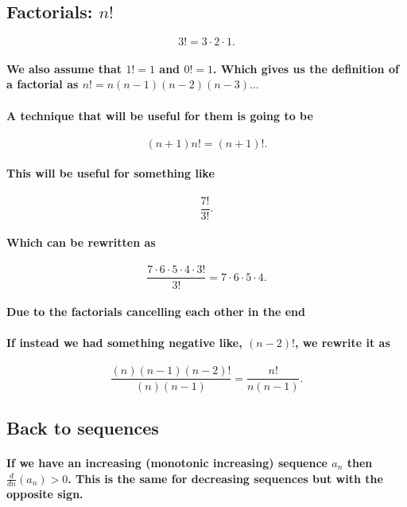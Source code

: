 \subsection{Factorials: $ n! $}%
\label{sub:Factorials: $ n! $}

\[
	3! = 3 \cdot 2\cdot 1
.\] 
\paragraph{We also assume that $ 1! = 1 $ and $ 0! = 1 $. Which gives us the definition of a factorial as $ n! = n\left( n-1 \right) \left( n-2 \right)  \left( n-3 \right) \ldots$}
\paragraph{A technique that will be useful for them is going to be }

\[
	\left( n+1 \right) n! = \left( n+1 \right) !
.\] 

\paragraph{This will be useful for something like}
\[
\frac{ 7! }{ 3! }
.\] 

\paragraph{Which can be rewritten as}
\[
\frac{ 7\cdot 6\cdot 5\cdot 4\cdot 3! }{ 3! }=7\cdot 6\cdot 5\cdot 4
.\] 
\paragraph{Due to the factorials cancelling each other in the end}

\paragraph{If instead we had something negative like, $ \left( n-2 \right) ! $, we rewrite it as}

\[
\frac{ \left( n \right) \left( n-1 \right) \left( n-2 \right) ! }{ \left( n \right) \left( n-1 \right)  } = \frac{ n! }{ n\left( n-1 \right)  }
.\] 

\subsection{Back to sequences}%
\label{sub:Back to sequences}

\paragraph{If we have an increasing (monotonic increasing) sequence $ a_n $ then $ \frac{d}{dn}\left( a_n \right) >0 $. This is the same for decreasing sequences but with the opposite sign.}

